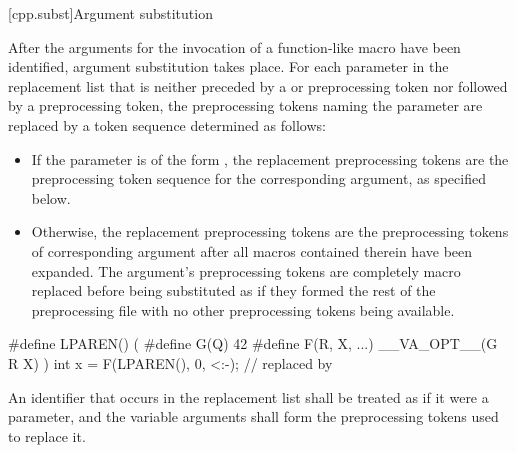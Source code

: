 [cpp.subst]{Argument substitution}%
%
%

%
\begin{bnf}
\br
      \terminal{)}
\end{bnf}

\pnum
After the arguments for the invocation of a function-like macro have
been identified, argument substitution takes place.
For each parameter in the replacement list that is neither
preceded by a \tcode{\#} or \tcode{\#\#} preprocessing token nor
followed by a \tcode{\#\#} preprocessing token, the preprocessing tokens
naming the parameter are replaced by a token sequence determined as follows:
\begin{itemize}
\item
  If the parameter is of the form ,
  the replacement preprocessing tokens are the
  preprocessing token sequence for the corresponding argument,
  as specified below.
\item
  Otherwise, the replacement preprocessing tokens are the
  preprocessing tokens of corresponding argument after all
  macros contained therein have been expanded. The argument's
  preprocessing tokens are completely macro replaced before
  being substituted as if they formed the rest of the preprocessing
  file with no other preprocessing tokens being available.
\end{itemize}
\begin{example}
\begin{codeblock}
#define LPAREN() (
#define G(Q) 42
#define F(R, X, ...)  __VA_OPT__(G R X) )
int x = F(LPAREN(), 0, <:-);    // replaced by 
\end{codeblock}
\end{example}

\pnum
{}%
An identifier  that occurs in the replacement list
shall be treated as if it were a parameter, and the variable arguments shall form
the preprocessing tokens used to replace it.

